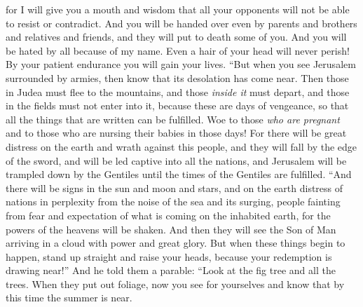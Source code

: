 \begin{biblechapter}
\verse for I will give you a mouth and wisdom that all your opponents will not be able to resist or contradict.
\verse And you will be handed over even by parents and brothers and relatives and friends, and they will put to death some of you.
\verse And you will be hated by all because of my name.
\verse Even a hair of your head will never perish!
\verse By your patient endurance you will gain your lives.
 “But when you see Jerusalem surrounded by armies, then know that its desolation has come near.
\verse Then those in Judea must flee to the mountains, and those \textit{inside it} must depart, and those in the fields must not enter into it,
\verse because these are days of vengeance, so that all the things that are written can be fulfilled.
\verse Woe to those \textit{who are pregnant} and to those who are nursing their babies in those days! For there will be great distress on the earth and wrath against this people,
\verse and they will fall by the edge of the sword, and will be led captive into all the nations, and Jerusalem will be trampled down by the Gentiles until the times of the Gentiles are fulfilled.
 “And there will be signs in the sun and moon and stars, and on the earth distress of nations in perplexity from the noise of the sea and its surging,
\verse people fainting from fear and expectation of what is coming on the inhabited earth, for the powers of the heavens will be shaken.
\verse And then they will see the Son of Man arriving in a cloud with power and great glory.
\verse But when these things begin to happen, stand up straight and raise your heads, because your redemption is drawing near!”
 And he told them a parable: “Look at the fig tree and all the trees.
\verse When they put out foliage, now you see for yourselves and know that by this time the summer is near.

\end{biblechapter}
